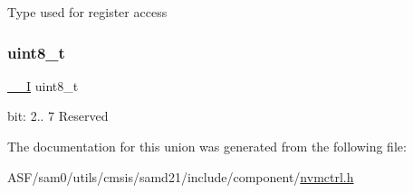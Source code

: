 Type used for register access \mbox{\label{union_n_v_m_c_t_r_l___i_n_t_f_l_a_g___type_a5b4208c6f4c4a4290c4f2804d1eb1d5b}} 
\subsubsection{\texorpdfstring{uint8\_t}{uint8\_t}}
{\footnotesize\ttfamily \mbox{\hyperlink{core__cm0plus_8h_af63697ed9952cc71e1225efe205f6cd3}{\+\_\+\+\_\+I}} uint8\+\_\+t}

bit\+: 2.. 7 Reserved 

The documentation for this union was generated from the following file\+:\begin{DoxyCompactItemize}
\item 
A\+S\+F/sam0/utils/cmsis/samd21/include/component/\mbox{\hyperlink{component_2nvmctrl_8h}{nvmctrl.\+h}}\end{DoxyCompactItemize}
